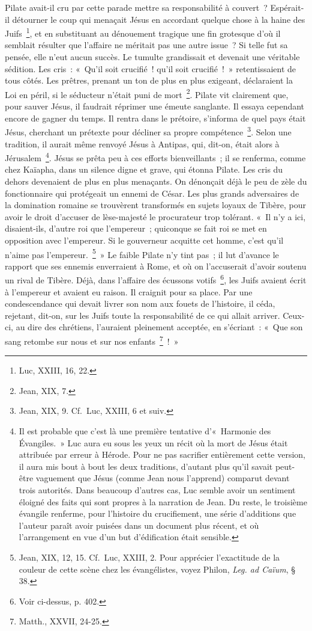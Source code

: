 \documentclass[french,twoside]{book} %
\begin{document}
Pilate avait-il cru par cette parade mettre sa responsabilité à couvert ? Espérait-il détourner le coup qui menaçait Jésus en accordant quelque chose à la haine des Juifs \footnote{Luc, XXIII, 16, 22.}, et en substituant au dénouement tragique une fin grotesque d’où il semblait résulter que l’affaire ne méritait pas une autre issue ? Si telle fut sa pensée, elle n’eut aucun succès. Le tumulte grandissait et devenait une véritable sédition. Les cris : « Qu’il soit crucifié ! qu’il soit crucifié ! » retentissaient de tous côtés. Les prêtres, prenant un ton de plus en plus exigeant, déclaraient la Loi en péril, si le séducteur n’était puni de mort \footnote{Jean, XIX, 7.}. Pilate vit clairement que, pour sauver Jésus, il faudrait réprimer une émeute sanglante. Il essaya cependant encore de gagner du temps. Il rentra dans le prétoire, s’informa de quel pays était Jésus, cherchant un prétexte pour décliner sa propre compétence \footnote{Jean, XIX, 9. Cf. Luc, XXIII, 6 et suiv.}. Selon une tradition, il aurait même renvoyé Jésus à Antipas, qui, dit-on, était alors à Jérusalem \footnote{Il est probable que c’est là une première tentative d’« Harmonie des Évangiles. » Luc aura eu sous les yeux un récit où la mort de Jésus était attribuée par erreur à Hérode. Pour ne pas sacrifier entièrement cette version, il aura mis bout à bout les deux traditions, d’autant plus qu’il savait peut-être vaguement que Jésus (comme Jean nous l’apprend) comparut devant trois autorités. Dans beaucoup d’autres cas, Luc semble avoir un sentiment éloigné des faits qui sont propres à la narration de Jean. Du reste, le troisième évangile renferme, pour l’histoire du crucifiement, une série d’additions que l’auteur paraît avoir puisées dans un document plus récent, et où l’arrangement en vue d’un but d’édification était sensible.}. Jésus se prêta peu à ces efforts bienveillants ; il se renferma, comme chez Kaïapha, dans un silence digne et grave, qui étonna Pilate. Les cris du dehors devenaient de plus en plus menaçants. On dénonçait déjà le peu de zèle du fonctionnaire qui protégeait un ennemi de César. Les plus grands adversaires de la domination romaine se trouvèrent transformés en sujets loyaux de Tibère, pour avoir le droit d’accuser de lèse-majesté le procurateur trop tolérant. « Il n’y a ici, disaient-ils, d’autre roi que l’empereur ; quiconque se fait roi se met en opposition avec l’empereur. Si le gouverneur acquitte cet homme, c’est qu’il n’aime pas l’empereur. \footnote{ Jean, XIX, 12, 15. Cf. Luc, XXIII, 2. Pour apprécier l’exactitude de la couleur de cette scène chez les évangélistes, voyez Philon, {\itshape Leg. ad Caïum}, § 38.} » Le faible Pilate n’y tint pas ; il lut d’avance le rapport que ses ennemis enverraient à Rome, et où on l’accuserait d’avoir soutenu un rival de Tibère. Déjà, dans l’affaire des écussons votifs \footnote{Voir ci-dessus, p. 402.}, les Juifs avaient écrit à l’empereur et avaient eu raison. Il craignit pour sa place. Par une condescendance qui devait livrer son nom aux fouets de l’histoire, il céda, rejetant, dit-on, sur les Juifs toute la responsabilité de ce qui allait arriver. Ceux-ci, au dire des chrétiens, l’auraient pleinement acceptée, en s’écriant : « Que son sang retombe sur nous et sur nos enfants \footnote{Matth., XXVII, 24-25.} ! »\par
\end{document}
